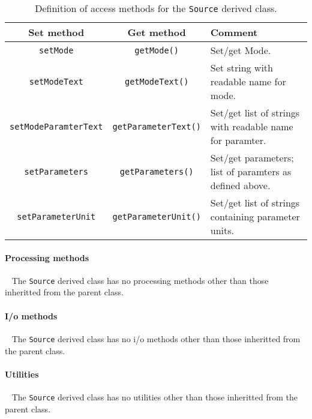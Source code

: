 \begin{table}[h]
  \caption{
    Definition of access methods for the \texttt{Source} derived
    class. 
  }
  \label{Tab:Source:Methods}
  \begin{center}
    \begin{tabular}{|c|c|p{5cm}|}
      \hline
      \textbf{Set method} & \textbf{Get method}  & \textbf{Comment}                                                 \\
      \hline
      \texttt{setMode}             & \texttt{getMode()}          & Set/get Mode.                \\
      \texttt{setModeText}         & \texttt{getModeText()}      & Set string with readable name for mode.  \\
      \texttt{setModeParamterText} & \texttt{getParameterText()} & Set/get list of strings with readable name for paramter. \\
      \texttt{setParameters}       & \texttt{getParameters()}    & Set/get parameters; list of paramters as defined above. \\ 
      \texttt{setParameterUnit}    & \texttt{getParameterUnit()} & Set/get list of strings containing parameter units.  \\
      \hline
    \end{tabular}
  \end{center}
\end{table}

\paragraph{Processing methods} ~\newline
\noindent
The \texttt{Source} derived class has no processing
methods other than those inheritted from the parent class.

\paragraph{I/o methods} ~\newline
\noindent
The \texttt{Source} derived class has no i/o methods other
than those inheritted from the parent class.

\paragraph{Utilities} ~\newline
\noindent
The \texttt{Source} derived class has no utilities other
than those inheritted from the parent class. 

